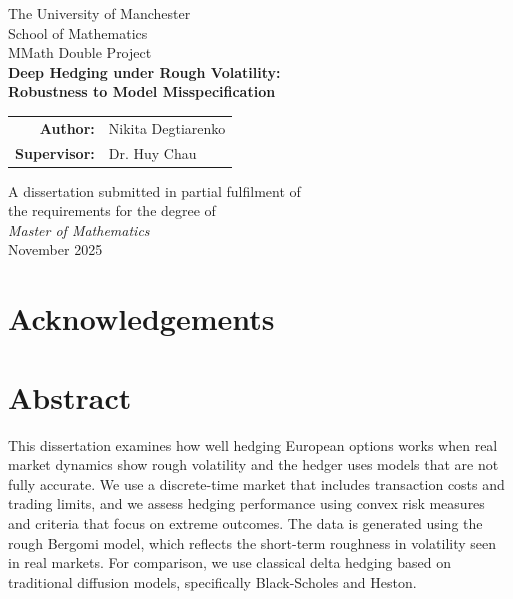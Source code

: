 \documentclass[12pt,a4paper]{article}
\theoremstyle{definition}
\theoremstyle{plain}
\theoremstyle{remark}
\theoremstyle{plain}
\newcommand{\ThesisTitle}{Deep Hedging under Rough Volatility:\\
Robustness to Model Misspecification}
\newcommand{\ThesisAuthor}{Nikita Degtiarenko}
\newcommand{\ThesisDegree}{MMath Double Project}
\newcommand{\ThesisSchool}{School of Mathematics}
\newcommand{\ThesisUniversity}{The University of Manchester}
\newcommand{\ThesisSupervisor}{Dr. Huy Chau}
\newcommand{\ThesisDate}{November 2025}
\begin{document}
\begin{titlepage}
    \thispagestyle{empty}
    \begin{center}
        {\Large \ThesisUniversity}\\[0.5cm]
        {\large \ThesisSchool}\\[2cm]

        {\large \ThesisDegree}\\[1cm]

        {\LARGE\bfseries \ThesisTitle}\\[2cm]

        \begin{tabular}{rl}
            \textbf{Author:}     & \ThesisAuthor \\[0.3cm]
            \textbf{Supervisor:} & \ThesisSupervisor \\
        \end{tabular}

        \vfill

        A dissertation submitted in partial fulfilment of\\
        the requirements for the degree of\\[0.3cm]
        \textit{Master of Mathematics}\\[0.8cm]

        {\ThesisDate}
    \end{center}
\end{titlepage}

\clearpage

\thispagestyle{empty}
\section*{Acknowledgements}
\newpage

\clearpage
\thispagestyle{empty}

\section*{Abstract}

This dissertation examines how well hedging European options works when real market dynamics show rough volatility and the hedger uses models that are not fully accurate.
We use a discrete-time market that includes transaction costs and trading limits, and we assess hedging performance using convex risk measures and criteria that focus on extreme outcomes.
The data is generated using the rough Bergomi model, which reflects the short-term roughness in volatility seen in real markets. For comparison, we use classical delta hedging based on traditional diffusion models, specifically Black-Scholes and Heston.
\end{document}
